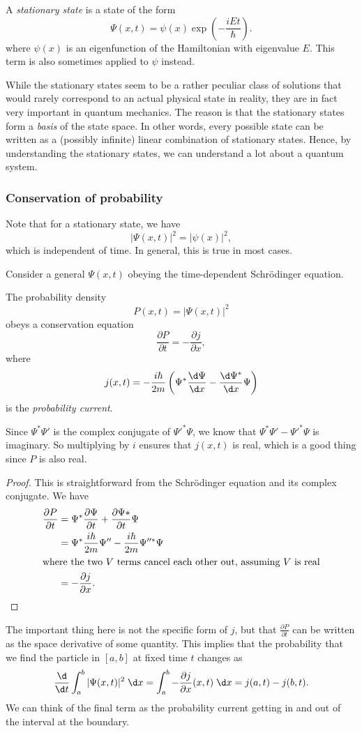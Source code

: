 \documentclass[a4paper]{article}
\begin{document}
\begin{defi}
  A \emph{stationary state} is a state of the form
  \[
    \Psi(x, t) = \psi(x) \exp\left(-\frac{iEt}{\hbar}\right).
  \]
  where $\psi(x)$ is an eigenfunction of the Hamiltonian with eigenvalue $E$. This term is also sometimes applied to $\psi$ instead.
\end{defi}
While the stationary states seem to be a rather peculiar class of solutions that would rarely correspond to an actual physical state in reality, they are in fact very important in quantum mechanics. The reason is that the stationary states form a \emph{basis} of the state space. In other words, every possible state can be written as a (possibly infinite) linear combination of stationary states. Hence, by understanding the stationary states, we can understand a lot about a quantum system.

\subsubsection*{Conservation of probability}
Note that for a stationary state, we have
\[
  |\Psi(x, t)|^2 = |\psi(x)|^2,
\]
which is independent of time. In general, this is true in most cases.

Consider a general $\Psi(x, t)$ obeying the time-dependent Schr\"odinger equation.

\begin{prop}
  The probability density
  \[
    P(x, t) = |\Psi(x, t)|^2
  \]
  obeys a conservation equation
  \[
    \frac{\partial P}{\partial t} = - \frac{\partial j}{\partial x},
  \]
  where
  \[
    j(x, t) = -\frac{i\hbar}{2m} \left(\Psi^*\frac{\d \Psi}{\d x} - \frac{\d \Psi^*}{\d x} \Psi\right)
  \]
  is the \emph{probability current}.
\end{prop}
Since $\Psi^* \Psi'$ is the complex conjugate of $\Psi'^* \Psi$, we know that $\Psi^*\Psi' - \Psi'^* \Psi$ is imaginary. So multiplying by $i$ ensures that $j(x, t)$ is real, which is a good thing since $P$ is also real.

\begin{proof}
  This is straightforward from the Schr\"odinger equation and its complex conjugate. We have
  \begin{align*}
    \frac{\partial P}{\partial t} &= \Psi^* \frac{\partial \Psi}{\partial t} + \frac{\partial \Psi*}{\partial t} \Psi\\
    &= \Psi^* \frac{i\hbar }{2m}\Psi'' - \frac{i\hbar}{2m}\Psi''^* \Psi\\
    \intertext{where the two $V$ terms cancel each other out, assuming $V$ is real}
    &= -\frac{\partial j}{\partial x}.\qedhere
  \end{align*}
\end{proof}
The important thing here is not the specific form of $j$, but that $\frac{\partial P}{\partial t}$ can be written as the space derivative of some quantity. This implies that the probability that we find the particle in $[a, b]$ at fixed time $t$ changes as
\[
  \frac{\d}{\d t}\int_a^b |\Psi(x, t)|^2 \;\d x = \int_a^b -\frac{\partial j}{\partial x}(x, t)\;\d x = j(a, t) - j(b, t).
\]
We can think of the final term as the probability current getting in and out of the interval at the boundary.
\end{document}
